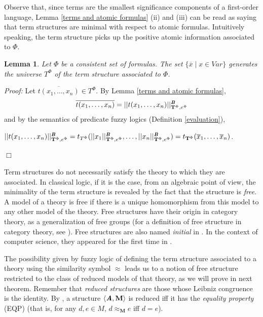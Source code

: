 \documentclass{IOS-Book-Article}
\newtheorem{lemma}{Lemma}
\newenvironment{proof}{ \noindent \textit{Proof:} }
{\hfill$\Box$\endtrivlist}
\begin{document}
\bigskip
Observe that, since terms are the smallest significance components of a first-order language, Lemma \ref{terms and atomic formulas} (ii) and (iii) can be read as saying that term structures are minimal with respect to atomic formulas. Intuitively speaking, the term structure picks up the positive atomic information associated to $\Phi$. 

\smallskip


\begin{lemma} \label{generates} Let $\Phi$ be a consistent set of formulas. The set $\{\overline{x}\mid x\in Var\}$ generates the universe $T^{\Phi}$ of the term structure associated to $\Phi$.  
\end{lemma}
\begin{proof}
Let $\overline{t(x_1,\ldots,x_n)}\in T^{\Phi}$. By Lemma \ref{terms and atomic formulas}, $$\overline{t(x_1,\ldots,x_n)}=||t(x_1,\ldots,x_n) ||^{\emph{\textbf{B}}}_{\mathrm{\mathbf{T}}^{\Phi},e^{\Phi}}$$ and by the semantics of predicate fuzzy logics (Definition \ref{evaluation}), \begin{center}

$||t(x_1,\ldots,x_n) ||^{\emph{\textbf{B}}}_{\mathrm{\mathbf{T}}^{\Phi},e^{\Phi}}=t_{T^{\Phi}}(||x_1||^{\emph{\textbf{B}}}_{\mathrm{\mathbf{T}}^{\Phi},e^{\Phi}},\ldots,||x_n ||^{\emph{\textbf{B}}}_{\mathrm{\mathbf{T}}^{\Phi},e^{\Phi}})=t_{\mathrm{\mathbf{T}}^{\Phi}}(\overline{x}_1,\ldots,\overline{x}_n)$. \end{center}  \end{proof} 

\bigskip

Term structures do not necessarily satisfy the theory to which they are associated. In classical logic, if it is the case, from an algebraic point of view, the minimality of the term structure is revealed by the fact that the structure is \emph{free}. A model of a theory is free if there is a unique homomorphism from this model to any other model of the theory. Free structures have their origin in category theory, as a generalization of free groups (for a definition of free structure in category theory, see \cite[Def. 4.7.17]{BaWe98}). Free structures are also named \emph{initial} in \cite[Def. 2.1 (i)]{Mak87}. In the context of computer science, they appeared for the first time in \cite{GoThWaWr75}. 

The possibility given by fuzzy logic of defining the term structure associated to a theory using the similarity symbol $\approx$ leads us to a notion of free structure restricted to the class of reduced models of that theory, as we will prove in next theorem. Remember that \emph{reduced structures} are those whose Leibniz congruence is the identity. By \cite[Lemma 20]{De12}, a structure $\langle\emph{\textbf{A}},\mathrm{\mathbf{M}}\rangle$ is reduced iff it has the \emph{equality property} (EQP) (that is, for any $d,e\in M$, 
$d\approx_{\mathrm{\mathbf{M}}}  e$ iff $d=e$). 
\end{document}
